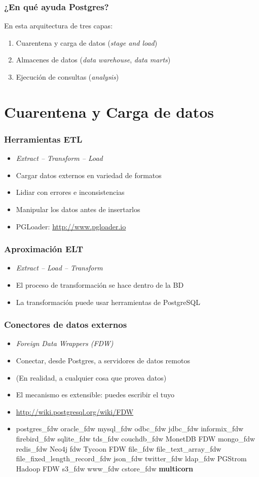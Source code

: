 \frame
{ \frametitle{¿En qué ayuda Postgres?}
	{\Large En esta arquitectura de tres capas:}

	\vfill
	\begin{enumerate}
		\item	Cuarentena y carga de datos (\emph{stage and load})
		\item	Almacenes de datos (\emph{data warehouse}, \emph{data marts})
		\item	Ejecución de consultas (\emph{analysis})
	\end{enumerate}
}

\section{Cuarentena y Carga de datos}

\frame
{ \frametitle{Herramientas ETL}

\begin{itemize}
	\item \emph{\Large Extract -- Transform -- Load}
	\item Cargar datos externos en variedad de formatos
	\item Lidiar con errores e inconsistencias
	\item Manipular los datos antes de insertarlos
	\item PGLoader: \url{http://www.pgloader.io}
\end{itemize}
}

\frame
{ \frametitle{Aproximación ELT}

\begin{itemize}
	\item \emph{\Large Extract -- Load -- Transform}
	\item El proceso de transformación se hace dentro de la BD
	\item La transformación puede usar herramientas de PostgreSQL
\end{itemize}
}

\frame
{ \frametitle{Conectores de datos externos}

\begin{itemize}
	\item \emph{Foreign Data Wrappers (FDW)}
	\item Conectar, desde Postgres, a servidores de datos remotos
	\item (En realidad, a cualquier cosa que provea datos)
	\item El mecanismo es extensible: puedes escribir el tuyo
	\item \url{http://wiki.postgresql.org/wiki/FDW}

\item \tiny
 postgres\_fdw
 oracle\_fdw
 mysql\_fdw
 odbc\_fdw
 jdbc\_fdw
 informix\_fdw
 firebird\_fdw
 sqlite\_fdw
 tds\_fdw
 couchdb\_fdw
 MonetDB FDW
 mongo\_fdw
 redis\_fdw
 Neo4j fdw
 Tycoon FDW
 file\_fdw
 file\_text\_array\_fdw
 file\_fixed\_length\_record\_fdw
 json\_fdw
 twitter\_fdw
 ldap\_fdw
 PGStrom
 Hadoop FDW
 s3\_fdw
 www\_fdw
 cstore\_fdw
 {\bf multicorn }


\end{itemize}
}

